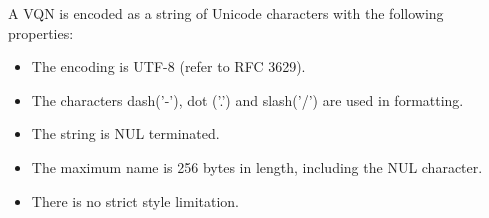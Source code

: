 A VQN is encoded as a string of Unicode characters with the following properties:

\begin{itemize}
\item The encoding is UTF-8 (refer to RFC 3629).
\item The characters dash('-'), dot ('.') and slash('/') are used in formatting.
\item The string is NUL terminated.
\item The maximum name is 256 bytes in length, including the NUL character.
\item There is no strict style limitation.
\end{itemize}
